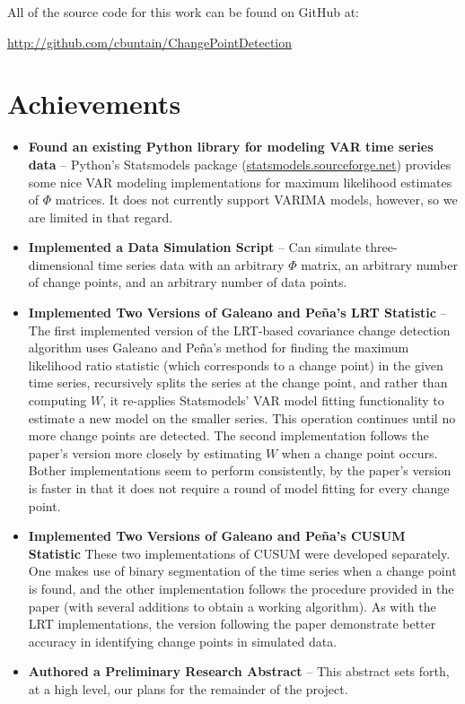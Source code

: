 \documentclass[10pt,letterpaper]{article}
\begin{document}
\maketitle

All of the source code for this work can be found on GitHub at:

\url{http://github.com/cbuntain/ChangePointDetection}

\section{Achievements}

\begin{itemize}
\item \textbf{Found an existing Python library for modeling VAR time series data} -- Python's Statsmodels package (\url{statsmodels.sourceforge.net}) provides some nice VAR modeling implementations for maximum likelihood estimates of $\Phi$ matrices. It does not currently support VARIMA models, however, so we are limited in that regard.
\item \textbf{Implemented a Data Simulation Script} -- Can simulate three-dimensional time series data with an arbitrary $\Phi$ matrix, an arbitrary number of change points, and an arbitrary number of data points.
\item \textbf{Implemented Two Versions of Galeano and Pe\~{n}a's LRT Statistic} -- The first implemented version of the LRT-based covariance change detection algorithm uses Galeano and Pe\~{n}a's method for finding the maximum likelihood ratio statistic (which corresponds to a change point) in the given time series, recursively splits the series at the change point, and rather than computing $W$, it re-applies Statsmodels' VAR model fitting functionality to estimate a new model on the smaller series. This operation continues until no more change points are detected. The second implementation follows the paper's version more closely by estimating $W$ when a change point occurs. Bother implementations seem to perform consistently, by the paper's version is faster in that it does not require a round of model fitting for every change point.
\item \textbf{Implemented Two Versions of Galeano and Pe\~{n}a's CUSUM Statistic} These two implementations of CUSUM were developed separately. One makes use of binary segmentation of the time series when a change point is found, and the other implementation follows the procedure provided in the paper (with several additions to obtain a working algorithm). As with the LRT implementations, the version following the paper demonstrate better accuracy in identifying change points in simulated data.
\item \textbf{Authored a Preliminary Research Abstract} -- This abstract sets forth, at a high level, our plans for the remainder of the project.
\end{itemize}
\end{document}
